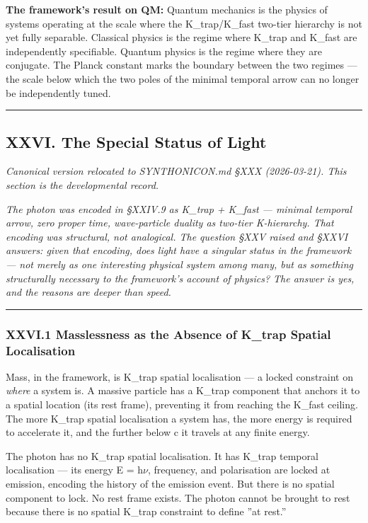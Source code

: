 \documentclass[12pt,a4paper]{article}
\begin{document}
\textbf{The framework's result on QM:} Quantum mechanics is the physics of systems operating at the scale where the K\_trap/K\_fast two-tier hierarchy is not yet fully separable. Classical physics is the regime where K\_trap and K\_fast are independently specifiable. Quantum physics is the regime where they are conjugate. The Planck constant \hbar marks the boundary between the two regimes --- the scale below which the two poles of the minimal temporal arrow can no longer be independently tuned.

\begin{center}
\rule{0.5\textwidth}{0.4pt}
\end{center}

\subsection{XXVI. The Special Status of Light}

\emph{Canonical version relocated to SYNTHONICON.md §XXX (2026-03-21). This section is the developmental record.}

\emph{The photon was encoded in §XXIV.9 as K\_trap + K\_fast --- minimal temporal arrow, zero proper time, wave-particle duality as two-tier K-hierarchy. That encoding was structural, not analogical. The question §XXV raised and §XXVI answers: given that encoding, does light have a singular status in the framework --- not merely as one interesting physical system among many, but as something structurally necessary to the framework's account of physics? The answer is yes, and the reasons are deeper than speed.}

\begin{center}
\rule{0.5\textwidth}{0.4pt}
\end{center}

\subsubsection{XXVI.1 Masslessness as the Absence of K\_trap Spatial Localisation}

Mass, in the framework, is K\_trap spatial localisation --- a locked constraint on \emph{where} a system is. A massive particle has a K\_trap component that anchors it to a spatial location (its rest frame), preventing it from reaching the K\_fast ceiling. The more K\_trap spatial localisation a system has, the more energy is required to accelerate it, and the further below c it travels at any finite energy.

The photon has no K\_trap spatial localisation. It has K\_trap temporal localisation --- its energy E = h$\nu$, frequency, and polarisation are locked at emission, encoding the history of the emission event. But there is no spatial component to lock. No rest frame exists. The photon cannot be brought to rest because there is no spatial K\_trap constraint to define ''at rest.''
\end{document}
